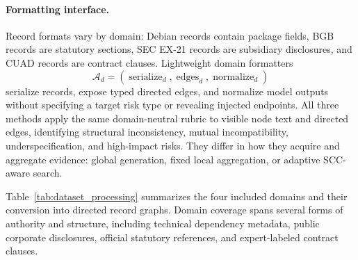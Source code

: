 \documentclass[11pt]{article}
\newcommand{\scc}{SCC}
\begin{document}
\begin{revredblock}
\paragraph{Formatting interface.}
Record formats vary by domain: Debian records contain package fields, BGB records are statutory sections, SEC EX-21 records are subsidiary disclosures, and CUAD records are contract clauses. Lightweight domain formatters
\begin{equation}
    \mathcal{A}_d=(\operatorname{serialize}_d,\operatorname{edges}_d,\operatorname{normalize}_d)
\end{equation}
serialize records, expose typed directed edges, and normalize model outputs without specifying a target risk type or revealing injected endpoints. All three methods apply the same domain-neutral rubric to visible node text and directed edges, identifying structural inconsistency, mutual incompatibility, underspecification, and high-impact risks. They differ in how they acquire and aggregate evidence: global generation, fixed local aggregation, or adaptive \scc{}-aware search.
\end{revredblock}


Table~\ref{tab:dataset_processing} summarizes the four included domains and their conversion into directed record graphs.  Domain coverage spans several forms of authority and structure, including technical dependency metadata, public corporate disclosures, official statutory references, and expert-labeled contract clauses.
\end{document}
